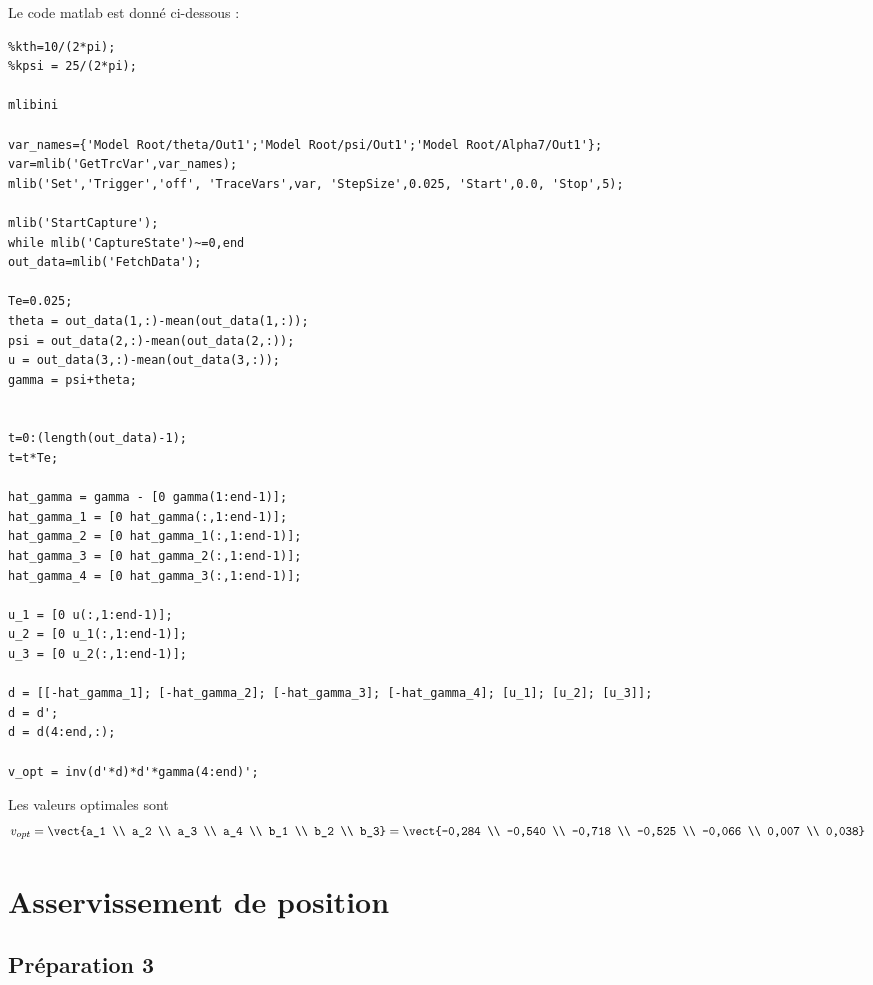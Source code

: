 \documentclass[../../Cours_M1.tex]{subfiles}
\begin{document}
Le code matlab est donné ci-dessous :
\begin{lstlisting}
%kth=10/(2*pi);
%kpsi = 25/(2*pi);

mlibini

var_names={'Model Root/theta/Out1';'Model Root/psi/Out1';'Model Root/Alpha7/Out1'};
var=mlib('GetTrcVar',var_names);
mlib('Set','Trigger','off', 'TraceVars',var, 'StepSize',0.025, 'Start',0.0, 'Stop',5);

mlib('StartCapture');
while mlib('CaptureState')~=0,end
out_data=mlib('FetchData');
    
Te=0.025;
theta = out_data(1,:)-mean(out_data(1,:));
psi = out_data(2,:)-mean(out_data(2,:));
u = out_data(3,:)-mean(out_data(3,:));
gamma = psi+theta;


t=0:(length(out_data)-1);
t=t*Te;

hat_gamma = gamma - [0 gamma(1:end-1)];
hat_gamma_1 = [0 hat_gamma(:,1:end-1)];
hat_gamma_2 = [0 hat_gamma_1(:,1:end-1)];
hat_gamma_3 = [0 hat_gamma_2(:,1:end-1)];
hat_gamma_4 = [0 hat_gamma_3(:,1:end-1)];

u_1 = [0 u(:,1:end-1)];
u_2 = [0 u_1(:,1:end-1)];
u_3 = [0 u_2(:,1:end-1)];

d = [[-hat_gamma_1]; [-hat_gamma_2]; [-hat_gamma_3]; [-hat_gamma_4]; [u_1]; [u_2]; [u_3]];
d = d';
d = d(4:end,:);

v_opt = inv(d'*d)*d'*gamma(4:end)';

\end{lstlisting}

Les valeurs optimales sont \[v_{opt} = \vect{a_1 \\ a_2 \\ a_3 \\ a_4 \\ b_1 \\ b_2 \\ b_3} = \vect{-0,284 \\
-0,540 \\
-0,718 \\
-0,525 \\
-0,066 \\
0,007 \\
0,038}\]

\section{Asservissement de position}

\subsection*{Préparation 3}
\end{document}
